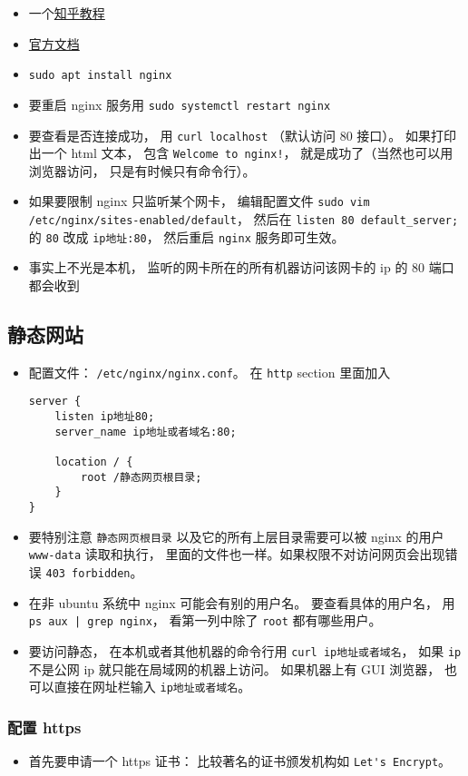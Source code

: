 
\begin{issues}
\issueDraft
\end{issues}

\begin{itemize}
\item 一个\href{https://zhuanlan.zhihu.com/p/80600540}{知乎教程}
\item \href{https://nginx.org/en/docs/}{官方文档}
\item \verb|sudo apt install nginx|
\item 要重启 nginx 服务用 \verb|sudo systemctl restart nginx|
\item 要查看是否连接成功， 用 \verb|curl localhost| （默认访问 80 接口）。 如果打印出一个 html 文本， 包含 \verb|Welcome to nginx!|， 就是成功了（当然也可以用浏览器访问， 只是有时候只有命令行）。
\item 如果要限制 nginx 只监听某个网卡， 编辑配置文件 \verb|sudo vim /etc/nginx/sites-enabled/default|， 然后在 \verb|listen 80 default_server;| 的 \verb|80| 改成 \verb|ip地址:80|， 然后重启 \verb|nginx| 服务即可生效。
\item 事实上不光是本机， 监听的网卡所在的所有机器访问该网卡的 ip 的 80 端口都会收到
\end{itemize}

\subsection{静态网站}
\begin{itemize}
\item 配置文件： \verb|/etc/nginx/nginx.conf|。 在 \verb|http| section 里面加入
\begin{lstlisting}[language=none]
server {
    listen ip地址80;
    server_name ip地址或者域名:80;
    
    location / {
        root /静态网页根目录;
    }
}
\end{lstlisting}
\item 要特别注意 \verb|静态网页根目录| 以及它的所有上层目录需要可以被 nginx 的用户 \verb|www-data| 读取和执行， 里面的文件也一样。如果权限不对访问网页会出现错误 \verb|403 forbidden|。
\item 在非 ubuntu 系统中 nginx 可能会有别的用户名。  要查看具体的用户名， 用 \verb`ps aux | grep nginx`， 看第一列中除了 \verb|root| 都有哪些用户。
\item 要访问静态， 在本机或者其他机器的命令行用 \verb|curl ip地址或者域名|， 如果 \verb|ip| 不是公网 ip 就只能在局域网的机器上访问。 如果机器上有 GUI 浏览器， 也可以直接在网址栏输入 \verb|ip地址或者域名|。
\end{itemize}

\subsubsection{配置 https}
\begin{itemize}
\item 首先要申请一个 https 证书： 比较著名的证书颁发机构如 \verb|Let's Encrypt|。
\end{itemize}

